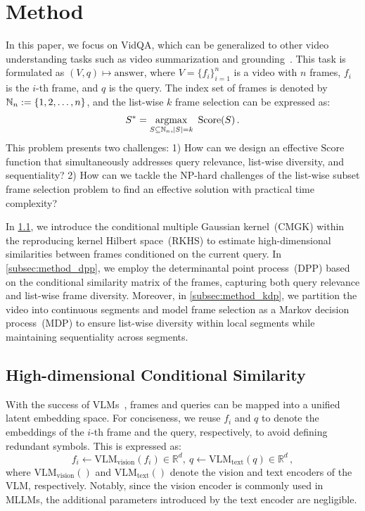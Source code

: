 \section{Method}\label{sec:method}
In this paper, we focus on VidQA, which can be generalized to other video understanding tasks such as video summarization and grounding~\cite{xiao2024can,liu2025timecraft}.
This task is formulated as \((V, q) \mapsto \text{answer}\), where \(V=\{f_i\}_{i=1}^{n}\) is a video with \(n\) frames, \(f_i\) is the \(i\)-th frame, and \(q\) is the query.
The index set of frames is denoted by \(\mathbb{N}_n := \{1, 2, \dots, n\}\), 
and the list-wise $k$ frame selection can be expressed as: 
\begin{equation}\label{eq:score}
    S^* = \mathop{\mathrm{argmax}}_{S \subseteq \mathbb{N}_n , \left|S\right|=k}\ \mathrm{Score}(S)\,.
\end{equation}
This problem presents two challenges:
1) How can we design an effective \(\mathrm{Score}\) function that simultaneously addresses query relevance, list-wise diversity, and sequentiality?
2) How can we tackle the NP-hard challenges of the list-wise subset frame selection problem to find an effective solution with practical time complexity?


In \cref{subsec:method_sim}, we introduce the conditional multiple Gaussian kernel~(CMGK) within the reproducing kernel Hilbert space~(RKHS) to estimate high-dimensional similarities between frames conditioned on the current query.
In \cref{subsec:method_dpp}, we employ the determinantal point process~(DPP) based on the conditional similarity matrix of the frames, capturing both query relevance and list-wise frame diversity. 
Moreover, in \cref{subsec:method_kdp}, we partition the video into continuous segments and model frame selection as a Markov decision process~(MDP) to ensure list-wise diversity within local segments while maintaining sequentiality across segments.



\subsection{High-dimensional Conditional Similarity}\label{subsec:method_sim}
With the success of VLMs~\cite{radford2021learning,zhai2023sigmoid,alayrac2022flamingo},
frames and queries can be mapped into a unified latent embedding space.
For conciseness, we reuse \(f_i\) and \(q\) to denote the embeddings of the \(i\)-th frame and the query, respectively, to avoid defining redundant symbols. 
This is expressed as:
\begin{equation}\label{eq:emb} 
	f_i \leftarrow \mathrm{VLM_{vision}}(f_i) \in \mathbb{R}^d, \ q \leftarrow \mathrm{VLM_{text}}(q) \in \mathbb{R}^d \,,
\end{equation}
where \(\mathrm{VLM_{vision}}()\) and \(\mathrm{VLM_{text}}()\) denote the vision and text encoders of the VLM, respectively.
Notably, since the vision encoder is commonly used in MLLMs, the additional parameters introduced by the text encoder are negligible.


